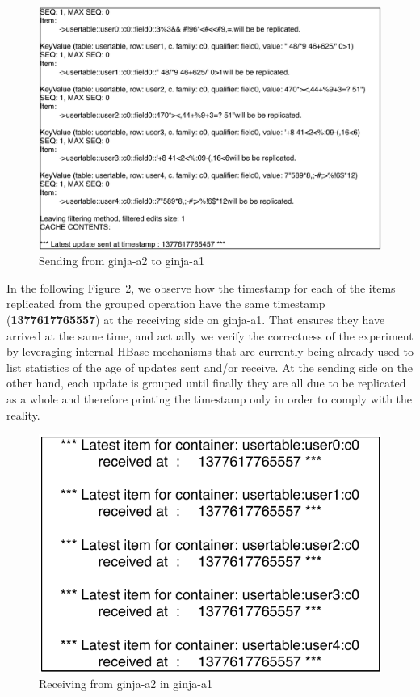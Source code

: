 
\begin{figure}[b]
\centering
\includegraphics[scale=0.6]{figs/ginja2-grouping-send.pdf}
\caption{Sending from ginja-a2 to ginja-a1}
\label{fig-shipping-grouping}
\end{figure}

In the following Figure~\ref{fig-receiving-grouping}, we observe how the timestamp for each of the items replicated from the grouped operation have the same timestamp (\textbf{1377617765557}) at the receiving side on ginja-a1. That ensures they have arrived at the same time, and actually we verify the correctness of the experiment by leveraging internal HBase mechanisms that are currently being already used to list statistics of the age of updates sent and/or receive. At the sending side on the other hand, each update is grouped until finally they are all due to be replicated as a whole and therefore printing the timestamp only in order to comply with the reality.

\begin{figure}[t]
\centering
\includegraphics[scale=.6]{figs/ginja1-grouping-receive.pdf}
\caption{Receiving from ginja-a2 in ginja-a1}
\label{fig-receiving-grouping}
\end{figure}
